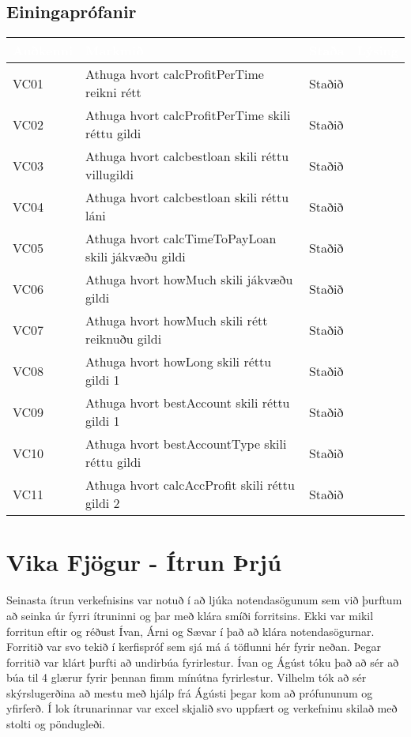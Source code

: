 \documentclass[a4paper,10pt]{article}
\begin{document}
\subsection{Einingaprófanir}
\begin{center}
    \begin{tabular}{| l | p{6cm} | l | l |}
    \hline
    \rowcolor{LightBlue!65}
     \textcolor{White}{Auðkenni} & \textcolor{White}{Markmið} & \textcolor{White}{Staða} & \textcolor{White}{Lýsing} \\ 
     \hline
     \hline
    \rowcolor{LightCol!30}
    VC01 & Athuga hvort calcProfitPerTime  reikni rétt & Staðið & \\ \hline
    VC02 & Athuga hvort calcProfitPerTime  skili réttu gildi & Staðið & \\ \hline
    \rowcolor{LightCol!30}
    VC03 & Athuga hvort calcbestloan  skili réttu villugildi & Staðið & \\ \hline
    VC04 & Athuga hvort calcbestloan  skili réttu láni & Staðið & \\ \hline
    \rowcolor{LightCol!30}
    VC05 & Athuga hvort calcTimeToPayLoan  skili jákvæðu gildi & Staðið & \\ \hline
    VC06 & Athuga hvort howMuch  skili jákvæðu gildi & Staðið & \\ \hline
    \rowcolor{LightCol!30}
    VC07 & Athuga hvort howMuch  skili rétt reiknuðu gildi & Staðið & \\ \hline
    VC08 & Athuga hvort howLong  skili réttu gildi 1& Staðið & \\ \hline
    \rowcolor{LightCol!30}
    VC09 & Athuga hvort bestAccount  skili réttu gildi 1 & Staðið & \\ \hline
    VC10 & Athuga hvort bestAccountType  skili réttu gildi & Staðið & \\ \hline
    \rowcolor{LightCol!30}
    VC11 & Athuga hvort calcAccProfit  skili réttu gildi 2& Staðið & \\ \hline
   
    \end{tabular}
\end{center}


\section{Vika Fjögur - Ítrun Þrjú}
Seinasta ítrun verkefnisins var notuð í að ljúka notendasögunum sem við þurftum að seinka úr fyrri ítruninni og þar með klára smíði forritsins.  Ekki var mikil forritun eftir og réðust Ívan, Árni og Sævar í það að klára notendasögurnar.  Forritið var svo tekið í kerfispróf sem sjá má á töflunni hér fyrir neðan.  Þegar forritið var klárt þurfti að undirbúa fyrirlestur.  Ívan og Ágúst tóku það að sér að búa til 4 glærur fyrir þennan fimm mínútna fyrirlestur.  Vilhelm tók að sér skýrslugerðina að mestu með hjálp frá Ágústi þegar kom að prófununum og yfirferð.  Í lok ítrunarinnar var excel skjalið svo uppfært og verkefninu skilað með stolti og pöndugleði.
\end{document}

